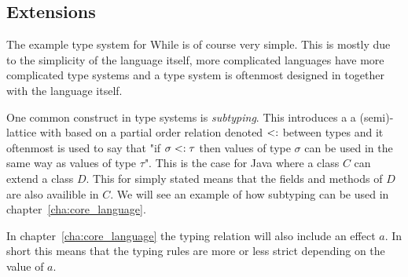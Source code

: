 \subsection{Extensions}
\label{sub:extensions}

The example type system for While is of course very simple. This is mostly due
to the simplicity of the language itself, more complicated languages have more
complicated type systems and a type system is oftenmost designed in together 
with the language itself. 

One common construct in type systems is \emph{subtyping}. This introduces a a
(semi)-lattice with based on a partial order relation denoted $<:$ between
types and it oftenmost is used to say that "if $\sigma <: \tau$ then values
of type $\sigma$ can be used in the same way as values of type $\tau$". This is
the case for Java where a class $C$ can extend a class $D$. This for simply
stated means that the fields and methods of $D$ are also availible in $C$. We
will see an example of how subtyping can be used in
chapter~\ref{cha:core_language}. 

In chapter~\ref{cha:core_language} the typing relation will also include an
effect $a$. In short this means that the typing rules are more or less strict
depending on the value of $a$.

